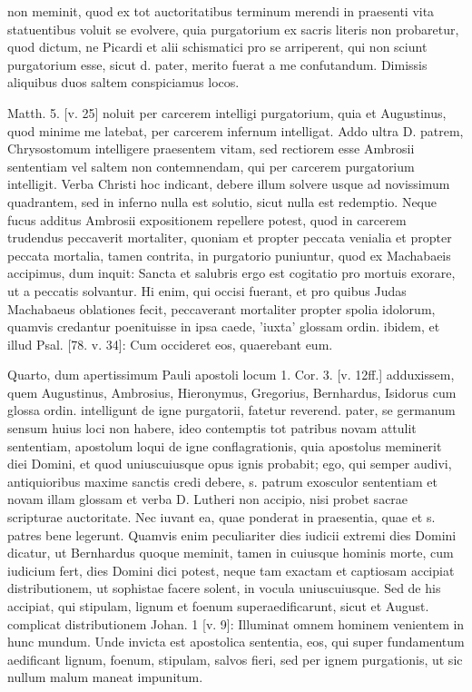 non meminit, quod ex tot auctoritatibus terminum merendi in praesenti vita statuentibus voluit se evolvere, quia purgatorium ex sacris literis non probaretur, quod dictum, ne Picardi et alii schismatici pro se arriperent, qui non sciunt purgatorium esse, sicut d. pater, merito fuerat a me confutandum. Dimissis aliquibus duos saltem conspiciamus locos.

Matth. 5. [v. 25] noluit per carcerem intelligi purgatorium, quia et Augustinus, quod minime me latebat, per carcerem infernum intelligat. Addo ultra D. patrem, Chrysostomum intelligere praesentem vitam, sed rectiorem esse Ambrosii sententiam vel saltem non contemnendam, qui per carcerem purgatorium intelligit. Verba Christi hoc indicant, debere illum solvere usque ad novissimum quadrantem, sed in inferno nulla est solutio, sicut nulla est redemptio. Neque fucus additus Ambrosii expositionem repellere potest, quod in carcerem trudendus peccaverit mortaliter, quoniam et propter peccata venialia et propter peccata mortalia, tamen contrita, in purgatorio puniuntur, quod ex Machabaeis accipimus, dum inquit: Sancta et salubris ergo est cogitatio pro mortuis exorare, ut a peccatis solvantur. Hi enim, qui occisi fuerant, et pro quibus Judas Machabaeus oblationes fecit, peccaverant mortaliter propter spolia idolorum, quamvis credantur poenituisse in \marginpar{\small[336]} ipsa caede, 'iuxta' glossam ordin. ibidem, et illud Psal. [78. v. 34]: Cum occideret eos, quaerebant eum.

Quarto, dum apertissimum Pauli apostoli locum 1. Cor. 3. [v. 12ff.] adduxissem, quem Augustinus, Ambrosius, Hieronymus, Gregorius, Bernhardus, Isidorus cum glossa ordin. intelligunt de igne purgatorii, fatetur reverend. pater, se germanum sensum huius loci non habere, ideo contemptis tot patribus novam attulit sententiam, apostolum loqui de igne conflagrationis, quia apostolus meminerit diei Domini, et quod uniuscuiusque opus ignis probabit; ego, qui semper audivi, antiquioribus maxime sanctis credi debere, s. patrum exosculor sententiam et novam illam glossam et verba D. Lutheri non accipio, nisi probet sacrae scripturae auctoritate. Nec iuvant ea, quae ponderat in praesentia, quae et s. patres bene legerunt. Quamvis enim peculiariter dies iudicii extremi dies Domini dicatur, ut Bernhardus quoque meminit, tamen in cuiusque hominis morte, cum iudicium fert, dies Domini dici potest, neque tam exactam et captiosam accipiat distributionem, ut sophistae facere solent, in vocula uniuscuiusque. Sed de his accipiat, qui stipulam, lignum et foenum superaedificarunt, sicut et August. complicat distributionem Johan. 1 [v. 9]: Illuminat omnem hominem venientem in hunc mundum. Unde invicta est apostolica sententia, eos, qui super fundamentum aedificant lignum, foenum, stipulam, salvos fieri, sed per ignem purgationis, ut sic nullum malum maneat impunitum.

